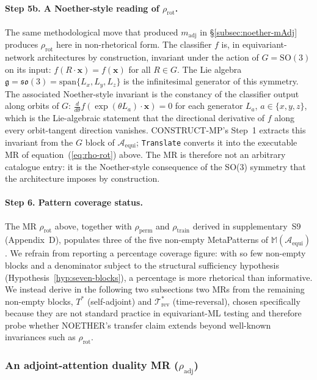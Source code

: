 \documentclass[manuscript]{acmart}
\begin{document}
\paragraph{Step 5b. A Noether-style reading of $\rho_{\mathrm{rot}}$.}
The same methodological move that produced $m_{\mathrm{adj}}$ in \S\ref{subsec:noether-mAdj} produces $\rho_{\mathrm{rot}}$ here in non-rhetorical form. The classifier $f$ is, in equivariant-network architectures by construction, invariant under the action of $G = \mathrm{SO}(3)$ on its input: $f(R \cdot \mathbf{x}) = f(\mathbf{x})$ for all $R \in G$. The Lie algebra $\mathfrak{g} = \mathfrak{so}(3) = \mathrm{span}\{L_x, L_y, L_z\}$ is the infinitesimal generator of this symmetry. The associated Noether-style invariant is the constancy of the classifier output along orbits of $G$: $\frac{d}{d\theta} f(\exp(\theta L_a) \cdot \mathbf{x}) = 0$ for each generator $L_a$, $a \in \{x,y,z\}$, which is the Lie-algebraic statement that the directional derivative of $f$ along every orbit-tangent direction vanishes. CONSTRUCT-MP's Step~1 extracts this invariant from the $G$ block of $\mathcal{A}_{\mathrm{equi}}$; \texttt{Translate} converts it into the executable MR of equation~(\ref{eq:rho-rot}) above. The MR is therefore not an arbitrary catalogue entry: it is the Noether-style consequence of the SO(3) symmetry that the architecture imposes by construction.

\paragraph{Step 6. Pattern coverage status.} The MR $\rho_{\mathrm{rot}}$ above, together with $\rho_{\mathrm{perm}}$ and $\rho_{\mathrm{train}}$ derived in supplementary~S9 (Appendix~D), populates three of the five non-empty MetaPatterns of $\mathbb{M}(\mathcal{A}_{\mathrm{equi}})$. We refrain from reporting a percentage coverage figure: with so few non-empty blocks and a denominator subject to the structural sufficiency hypothesis (Hypothesis~\ref{hyp:seven-blocks}), a percentage is more rhetorical than informative. We instead derive in the following two subsections two MRs from the remaining non-empty blocks, $T^{*}$ (self-adjoint) and $\mathcal{T}^{*}_{\mathrm{rev}}$ (time-reversal), chosen specifically because they are not standard practice in equivariant-ML testing and therefore probe whether NOETHER's transfer claim extends beyond well-known invariances such as $\rho_{\mathrm{rot}}$.

\subsubsection{An adjoint-attention duality MR (\texorpdfstring{$\rho_{\mathrm{adj}}$}{rho\_adj})}
\label{subsec:rho-adj}
\end{document}
